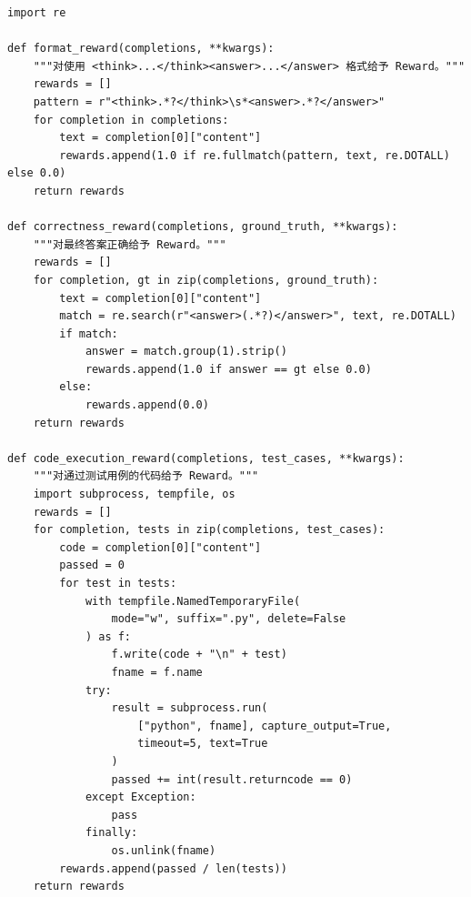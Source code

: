 \begin{examplebox}
\begin{lstlisting}[style=pythonstyle]
import re

def format_reward(completions, **kwargs):
    """对使用 <think>...</think><answer>...</answer> 格式给予 Reward。"""
    rewards = []
    pattern = r"<think>.*?</think>\s*<answer>.*?</answer>"
    for completion in completions:
        text = completion[0]["content"]
        rewards.append(1.0 if re.fullmatch(pattern, text, re.DOTALL) else 0.0)
    return rewards

def correctness_reward(completions, ground_truth, **kwargs):
    """对最终答案正确给予 Reward。"""
    rewards = []
    for completion, gt in zip(completions, ground_truth):
        text = completion[0]["content"]
        match = re.search(r"<answer>(.*?)</answer>", text, re.DOTALL)
        if match:
            answer = match.group(1).strip()
            rewards.append(1.0 if answer == gt else 0.0)
        else:
            rewards.append(0.0)
    return rewards

def code_execution_reward(completions, test_cases, **kwargs):
    """对通过测试用例的代码给予 Reward。"""
    import subprocess, tempfile, os
    rewards = []
    for completion, tests in zip(completions, test_cases):
        code = completion[0]["content"]
        passed = 0
        for test in tests:
            with tempfile.NamedTemporaryFile(
                mode="w", suffix=".py", delete=False
            ) as f:
                f.write(code + "\n" + test)
                fname = f.name
            try:
                result = subprocess.run(
                    ["python", fname], capture_output=True,
                    timeout=5, text=True
                )
                passed += int(result.returncode == 0)
            except Exception:
                pass
            finally:
                os.unlink(fname)
        rewards.append(passed / len(tests))
    return rewards
\end{lstlisting}
\end{examplebox}

